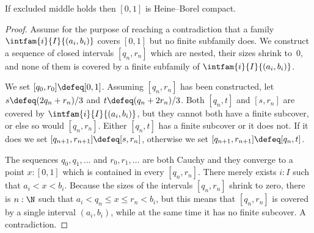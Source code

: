 \begin{thm} \label{classical-Heine-Borel}
  If excluded middle holds then $[0,1]$ is Heine--Borel compact.
\end{thm}

\begin{proof}
  Assume for the purpose of reaching a contradiction that a family $\intfam{i}{I}{(a_i,
    b_i)}$ covers $[0,1]$ but no finite subfamily does. We construct a sequence of closed
  intervals $[q_n, r_n]$ which are nested, their sizes shrink to~$0$, and none of them is covered
  by a finite subfamily of $\intfam{i}{I}{(a_i, b_i)}$.

  We set $[q_0, r_0] \defeq [0,1]$. Assuming $[q_n, r_n]$ has been constructed, let $s
  \defeq (2 q_n + r_n)/3$ and $t \defeq (q_n + 2 r_n)/3$. Both $[q_n, t]$ and $[s, r_n]$
  are covered by $\intfam{i}{I}{(a_i, b_i)}$, but they cannot both have a finite subcover,
  or else so would $[q_n, r_n]$. Either $[q_n, t]$ has a finite subcover or it does not.
  If it does we set $[q_{n+1}, r_{n+1}] \defeq [s, r_n]$, otherwise we set $[q_{n+1},
  r_{n+1}] \defeq [q_n, t]$.

  The sequences $q_0, q_1, \ldots$ and $r_0, r_1, \ldots$ are both Cauchy and they
  converge to a point $x : [0,1]$ which is contained in every $[q_n, r_n]$.
  There merely exists $i : I$ such that $a_i < x < b_i$. Because the sizes of the
  intervals $[q_n, r_n]$ shrink to zero, there is $n : \N$ such that $a_i < q_n \leq x
  \leq r_n < b_i$, but this means that $[q_n, r_n]$ is covered by a single interval $(a_i,
  b_i)$, while at the same time it has no finite subcover. A contradiction.
\end{proof}

